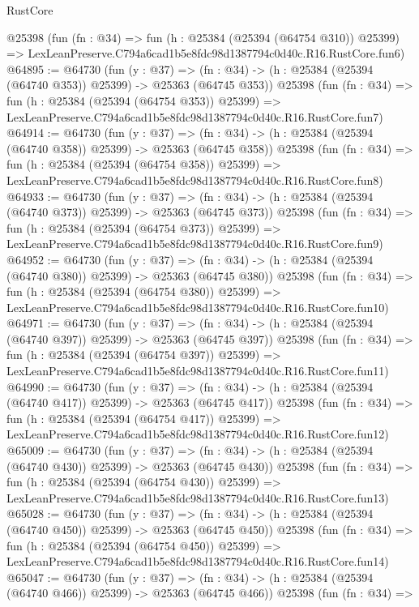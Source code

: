 \begin{lexlean}{RustCore}
\begin{coremodule}
    @25398
    (fun (fn : @34) =>
    fun (h : @25384 (@25394 (@64754 @310)) @25399) =>
    LexLeanPreserve.C794a6cad1b5e8fdc98d1387794c0d40c.R16.RustCore.fun6)
@64895 := @64730
    (fun (y : @37) =>
    (fn : @34) -> (h : @25384 (@25394 (@64740 @353)) @25399) -> @25363 (@64745 @353))
    @25398
    (fun (fn : @34) =>
    fun (h : @25384 (@25394 (@64754 @353)) @25399) =>
    LexLeanPreserve.C794a6cad1b5e8fdc98d1387794c0d40c.R16.RustCore.fun7)
@64914 := @64730
    (fun (y : @37) =>
    (fn : @34) -> (h : @25384 (@25394 (@64740 @358)) @25399) -> @25363 (@64745 @358))
    @25398
    (fun (fn : @34) =>
    fun (h : @25384 (@25394 (@64754 @358)) @25399) =>
    LexLeanPreserve.C794a6cad1b5e8fdc98d1387794c0d40c.R16.RustCore.fun8)
@64933 := @64730
    (fun (y : @37) =>
    (fn : @34) -> (h : @25384 (@25394 (@64740 @373)) @25399) -> @25363 (@64745 @373))
    @25398
    (fun (fn : @34) =>
    fun (h : @25384 (@25394 (@64754 @373)) @25399) =>
    LexLeanPreserve.C794a6cad1b5e8fdc98d1387794c0d40c.R16.RustCore.fun9)
@64952 := @64730
    (fun (y : @37) =>
    (fn : @34) -> (h : @25384 (@25394 (@64740 @380)) @25399) -> @25363 (@64745 @380))
    @25398
    (fun (fn : @34) =>
    fun (h : @25384 (@25394 (@64754 @380)) @25399) =>
    LexLeanPreserve.C794a6cad1b5e8fdc98d1387794c0d40c.R16.RustCore.fun10)
@64971 := @64730
    (fun (y : @37) =>
    (fn : @34) -> (h : @25384 (@25394 (@64740 @397)) @25399) -> @25363 (@64745 @397))
    @25398
    (fun (fn : @34) =>
    fun (h : @25384 (@25394 (@64754 @397)) @25399) =>
    LexLeanPreserve.C794a6cad1b5e8fdc98d1387794c0d40c.R16.RustCore.fun11)
@64990 := @64730
    (fun (y : @37) =>
    (fn : @34) -> (h : @25384 (@25394 (@64740 @417)) @25399) -> @25363 (@64745 @417))
    @25398
    (fun (fn : @34) =>
    fun (h : @25384 (@25394 (@64754 @417)) @25399) =>
    LexLeanPreserve.C794a6cad1b5e8fdc98d1387794c0d40c.R16.RustCore.fun12)
@65009 := @64730
    (fun (y : @37) =>
    (fn : @34) -> (h : @25384 (@25394 (@64740 @430)) @25399) -> @25363 (@64745 @430))
    @25398
    (fun (fn : @34) =>
    fun (h : @25384 (@25394 (@64754 @430)) @25399) =>
    LexLeanPreserve.C794a6cad1b5e8fdc98d1387794c0d40c.R16.RustCore.fun13)
@65028 := @64730
    (fun (y : @37) =>
    (fn : @34) -> (h : @25384 (@25394 (@64740 @450)) @25399) -> @25363 (@64745 @450))
    @25398
    (fun (fn : @34) =>
    fun (h : @25384 (@25394 (@64754 @450)) @25399) =>
    LexLeanPreserve.C794a6cad1b5e8fdc98d1387794c0d40c.R16.RustCore.fun14)
@65047 := @64730
    (fun (y : @37) =>
    (fn : @34) -> (h : @25384 (@25394 (@64740 @466)) @25399) -> @25363 (@64745 @466))
    @25398
    (fun (fn : @34) =>

\end{coremodule}
\end{lexlean}
